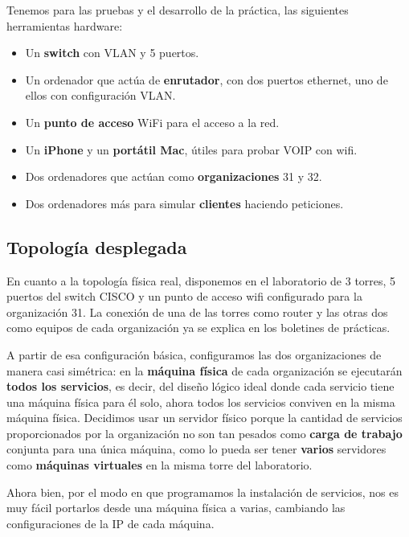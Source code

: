\documentclass[]{article}
\begin{document}
Tenemos para las pruebas y el desarrollo de la práctica, las siguientes herramientas hardware:

\begin{itemize}

	\item Un \textbf{switch} con VLAN y 5 puertos.
	\item Un ordenador que actúa de \textbf{enrutador}, con dos puertos ethernet, uno de ellos con configuración VLAN.
	\item Un \textbf{punto de acceso} WiFi para el acceso a la red.
	\item Un \textbf{iPhone} y un \textbf{portátil Mac}, útiles para probar VOIP con wifi.
	\item Dos ordenadores que actúan como \textbf{organizaciones} 31 y 32.
	\item Dos ordenadores más para simular \textbf{clientes} haciendo peticiones.

\end{itemize}




\subsection{Topología desplegada}

En cuanto a la topología física real, disponemos en el laboratorio de 3 torres, 5 puertos del switch CISCO y un punto de acceso wifi configurado para la organización 31. La conexión de una de las torres como router y las otras dos como equipos de cada organización ya se explica en los boletines de prácticas.

A partir de esa configuración básica, configuramos las dos organizaciones de manera casi simétrica: en la \textbf{máquina física} de cada organización se ejecutarán \textbf{todos los servicios}, es decir, del diseño lógico ideal donde cada servicio tiene una máquina física para él solo, ahora todos los servicios conviven en la misma máquina física. Decidimos usar un servidor físico porque la cantidad de servicios proporcionados por la organización no son tan pesados como \textbf{carga de trabajo} conjunta para una única máquina, como lo pueda ser tener \textbf{varios} servidores como \textbf{máquinas virtuales} en la misma torre del laboratorio.

Ahora bien, por el modo en que programamos la instalación de servicios, nos es muy fácil portarlos desde una máquina física a varias, cambiando las configuraciones de la IP de cada máquina.
\end{document}
